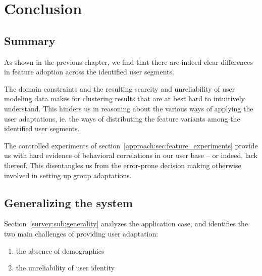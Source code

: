 \chapter{Conclusion}

\label{Chapter5}



\section{Summary} %
\label{conclusion:sec:summary}

As shown in the previous chapter, we find that there are indeed clear differences in feature adoption across the identified user segments.

The domain constraints and the resulting scarcity and unreliability of user modeling data makes for clustering results that are at best hard to intuitively understand. This hinders us in reasoning about the various ways of applying the user adaptations, ie. the ways of distributing the feature variants among the identified user segments.


The controlled experiments of section~\ref{approach:sec:feature_experiments} provide us with hard evidence of behavioral correlations in our user base -- or indeed, lack thereof. This disentangles us from the error-prone decision making otherwise involved in setting up group adaptations.

\section{Generalizing the system} %
\label{conclusion:sec:generalizing_the_system}

Section~\ref{survey:sub:generality} analyzes the application case, and identifies the two main challenges of providing user adaptation:

\begin{enumerate}
  \item the absence of demographics
  \item the unreliability of user identity
\end{enumerate}

